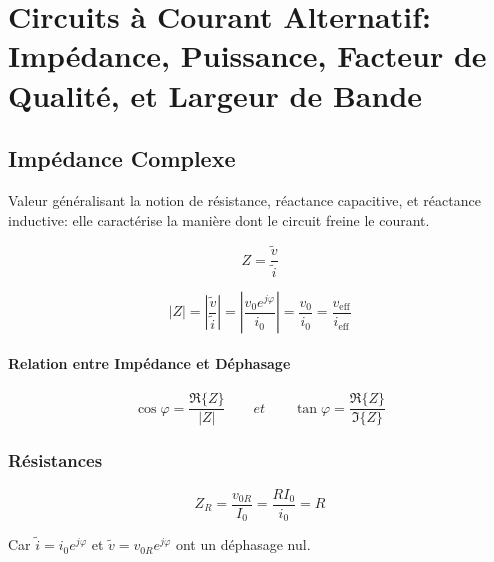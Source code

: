 \renewcommand\thesection{XIV}
\section{Circuits à Courant Alternatif: Impédance, Puissance, Facteur de Qualité, et Largeur de Bande}


\begin{multicols*}{2}
    \subsection{Impédance Complexe}
    Valeur généralisant la notion de résistance, réactance capacitive, et réactance inductive: elle caractérise la manière dont le circuit freine le courant.
    
    \[ Z = \frac{\tilde v}{\tilde i} \]
    
    \begin{center}
    \end{center}
    
    
    \[ |Z| = \left| \frac{\tilde v}{\tilde i} \right| = \left| \frac{v_0 e^{j\varphi}}{i_0} \right| = \frac{v_0}{i_0} = \frac{v_{\text{eff}}}{i_{\text{eff}}} \]
    
    \paragraph{Relation entre Impédance et Déphasage}
    \[ \cos \varphi = \frac{\Re\{Z\}}{|Z|} \qquad et \qquad \tan \varphi = \frac{\Re\{Z\}}{\Im\{Z\}}\]
    
    \subsubsection{Résistances}
    
    \[ Z_R = \frac{v_{0R}}{I_0} = \frac{RI_0}{i_0} = R \]
    
    Car $\tilde i = i_0e^{j\varphi}$ et $\tilde v = v_{0R} e^{j\varphi}$ ont un déphasage nul.
    

\end{multicols*}
